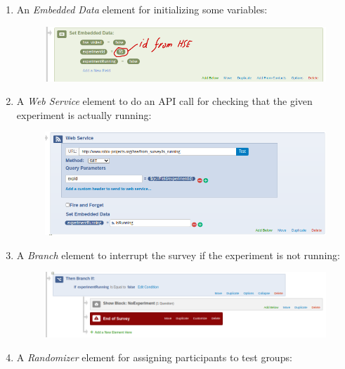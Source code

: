 \documentclass[fleqn]{article}
\begin{document}
\begin{enumerate}

\item
    An \emph{Embedded Data} element for initializing some variables:

    \begin{figure} [h]
    \centering
    \includegraphics[width=.9\textwidth]{img/qflow1}
    \label{fig:qflow1} 
    \end{figure}

\item
    A \emph{Web Service} element to do an API call for checking that the given experiment is actually running:

    \begin{figure} [h]
    \centering
    \includegraphics[width=.9\textwidth]{img/qflow2}
    \label{fig:qflow2} 
    \end{figure}

\newpage

\item
    A \emph{Branch} element to interrupt the survey if the experiment is not running:

    \begin{figure} [h]
    \centering
    \includegraphics[width=.9\textwidth]{img/qflow3}
    \label{fig:qflow3} 
    \end{figure}

\item
    A \emph{Randomizer} element for assigning participants to test groups:


\end{enumerate}
\end{document}
